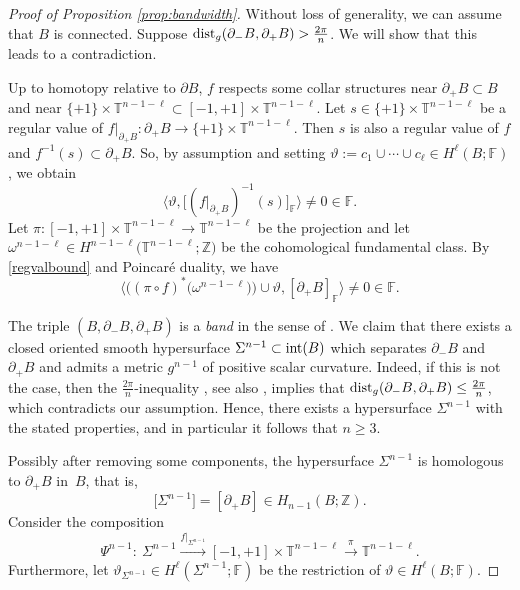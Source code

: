 \documentclass[10pt,a4paper]{amsart}
\numberwithin{equation}{section}
\newcommand{\F}{\mathbb{F}}
\newcommand{\Z}{\mathbb{Z}}
\newcommand{\TTT}{\mathbb{T}}
\begin{document}
\begin{proof}[Proof of Proposition \ref{prop:bandwidth}]
Without loss of generality, we can assume that $B$ is connected.
Suppose ${\rm dist}_g(\partial_- B , \partial_+B) > \frac{2\pi}{n}$.
We will show that this leads to a contradiction.


Up to homotopy relative to $\partial B$, $f$ respects some collar structures near $\partial_+ B \subset B$ and near $\{+1\} \times {\TTT}^{n-1-\ell} \subset [-1 , +1] \times {\TTT}^{n-1-\ell}$.
Let $s \in \{ +1\} \times {\TTT}^{n-1-\ell}$ be a regular value of $f|_{\partial_+ B} \colon \partial_+ B \to \{ +1\} \times {\TTT}^{n-1-\ell}$.
Then $s$ is also a regular value of $f$ and $f^{-1}(s) \subset \partial_+ B$.
So, by assumption and setting $\vartheta := c_1 \cup \cdots \cup c_{\ell} \in H^{\ell} (B; \F)$, we obtain
\begin{equation} \label{regvalbound}
 \big\langle \vartheta , \big[ ( f|_{\partial_+ B})^{-1} (s)\big]_\F \big\rangle \neq 0 \in \F.
\end{equation}
Let $\pi \colon [-1, +1] \times {\TTT}^{n-1-\ell} \to {\TTT}^{n-1-\ell}$ be the projection and let
$
 \omega^{n-1-\ell} \in H^{n-1-\ell}\big( {\TTT}^{n-1-\ell} ; \Z\big)
$
 be the cohomological fundamental class.
By \eqref{regvalbound} and Poincar\'e duality, we have
\begin{equation} \label{boundary}
 \big\langle \big( (\pi \circ f)^* \big(\omega^{n-1-\ell}\big) \big) \cup \vartheta , [ \partial_+ B]_\F \big\rangle \neq 0 \in \F.
\end{equation}

The triple $(B, \partial_- B, \partial_+ B)$ is a {\em band} in the sense of \cite[Definition 1.1]{Raede22}.
We claim that there exists a closed oriented smooth hypersurface $\Sigma^{n-1} \subset {\rm int}(B)$ which separates $\partial_- B$ and~$\partial_{+}B$ and admits a metric $g^{n-1}$ of positive scalar curvature.
Indeed, if this is not the case, then the $\frac{2\pi}{n}$-in\-equality \cite[Theorem 2.8]{Raede22}, see also \cite[Sections 3.6, 3.7 and 5.2]{Gr21}, implies that ${\rm dist}_g(\partial_- B , \partial_+B) \leq \frac{2\pi}{n}$, which contradicts our assumption.
Hence, there exists a hypersurface $\Sigma^{n-1}$ with the stated properties, and in particular it follows that $n \geq 3$.

Possibly after removing some components, the hypersurface $\Sigma^{n-1}$ is homologous to $\partial_+ B$ in~$B$, that is,
\begin{equation} \label{homologies}
 \big[\Sigma^{n-1}\big] = [\partial_+ B] \in H_{n-1}(B; \Z).
\end{equation}
Consider the composition
\[
 \Psi^{n-1} \colon\ \Sigma^{n-1} \stackrel{f|_{\Sigma^{n-1}}}{\longrightarrow} [ -1, +1] \times {\TTT}^{n-1-\ell} \stackrel{\pi}{\longrightarrow} {\TTT}^{n -1-\ell}.
\]
Furthermore, let $ \vartheta_{\Sigma^{n-1}} \in H^{\ell}(\Sigma^{n-1}; \F)$ be the restriction of $\vartheta \in H^{\ell}(B; \F)$.


\end{proof}
\end{document}
